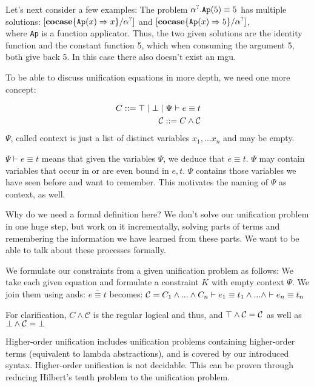 \documentclass[twoside,12pt,a4paper]{article}
\begin{document}
Let's next consider a few examples:
The problem $\alpha^?.\texttt{Ap}(5) \equiv 5$ has multiple solutions:
$[\textbf{cocase}\{\texttt{Ap}(x)\Rightarrow x\} / \alpha^?]$ and $[\textbf{cocase}\{\texttt{Ap}(x)\Rightarrow 5\} / \alpha^?]$,\\
where \texttt{Ap} is a function applicator. 
Thus, the two given solutions are the identity function and the constant function 5, which when consuming the argument 5, both give back 5.
In this case there also doesn't exist an mgu.


To be able to discuss unification equations in more depth, we need one more concept:

\begin{definition}[Constraint]
    \begin{align*}
        C ::= \top \;|\; \bot \;|\; \Psi \vdash e\equiv t\\
        \mathcal{C} ::= C \wedge \mathcal{C}
    \end{align*}
    $\Psi$, called context is just a list of distinct variables $x_1,...x_n$ and may be empty.
\end{definition}
$\Psi \vdash e\equiv t$ means that given the variables $\Psi$, we deduce that $e\equiv t$.
$\Psi$ may contain variables that occur in or are even bound in $e,t$. 
$\Psi$ contains those variables we have seen before and want to remember. This motivates the naming of $\Psi$ as context, as well.

Why do we need a formal definition here? We don't solve our unification problem in one huge step, but
work on it incrementally, solving parts of terms and remembering the information we have learned from these parts.
We want to be able to talk about these processes formally.

We formulate our constraints from a given unification problem as follows:
We take each given equation and formulate a constraint $K$ with empty context $\Psi$. We join them using ands: %
$\overline{e\equiv t}$ becomes: $\mathcal{C} = C_1 \wedge ... \wedge C_n  \vdash e_1 \equiv t_1 \wedge ...\wedge \vdash e_n \equiv t_n $  

For clarification, $C \wedge \mathcal{C}$ is the regular logical and thus, 
and $\top \wedge \mathcal{C} = \mathcal{C}$ as well as $\bot \wedge \mathcal{C} = \bot$

\begin{theorem}
    Higher-order unification includes unification problems containing higher-order terms (equivalent to lambda abstractions),
    and is covered by our introduced syntax. %
    Higher-order unification is not decidable. This can be proven through reducing Hilbert's tenth problem to the unification problem.
\end{theorem}
\end{document}
